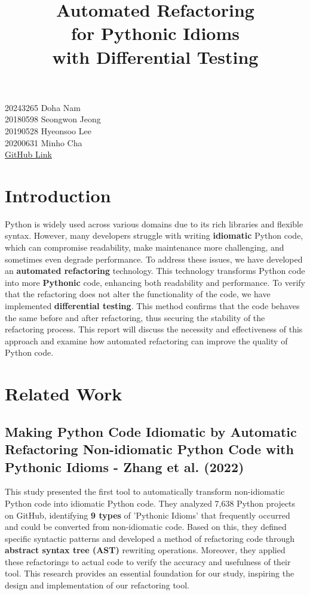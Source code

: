 \documentclass[11pt]{article}
\date{}
\title{Automated Refactoring\\for Pythonic Idioms\\with Differential Testing}
\begin{document}
\maketitle
\vspace{-2cm}
\thispagestyle{fancy}

\begin{flushright}
20243265 Doha Nam \\
20180598 Seongwon Jeong \\
20190528 Hyeonsoo Lee \\
20200631 Minho Cha \\
\href{https://github.com/waroad/Auto_refactoring-differential_testing}{GitHub Link}
\end{flushright}

\section{Introduction}
Python is widely used across various domains due to its rich libraries and flexible syntax. However, many developers struggle with writing \textbf{idiomatic} Python code, which can compromise readability, make maintenance more challenging, and sometimes even degrade performance. To address these issues, we have developed an \textbf{automated refactoring} technology. This technology transforms Python code into more \textbf{Pythonic} code, enhancing both readability and performance. To verify that the refactoring does not alter the functionality of the code, we have implemented \textbf{differential testing}. This method confirms that the code behaves the same before and after refactoring, thus securing the stability of the refactoring process. This report will discuss the necessity and effectiveness of this approach and examine how automated refactoring can improve the quality of Python code.

\section{Related Work}
\subsection{Making Python Code Idiomatic by Automatic Refactoring Non-idiomatic Python Code with Pythonic Idioms - Zhang et al. (2022)}
This study presented the first tool to automatically transform non-idiomatic Python code into idiomatic Python code. They analyzed 7,638 Python projects on GitHub, identifying \textbf{9 types} of 'Pythonic Idioms' that frequently occurred and could be converted from non-idiomatic code. Based on this, they defined specific syntactic patterns and developed a method of refactoring code through \textbf{abstract syntax tree (AST)} rewriting operations. Moreover, they applied these refactorings to actual code to verify the accuracy and usefulness of their tool. This research provides an essential foundation for our study, inspiring the design and implementation of our refactoring tool.
\end{document}
